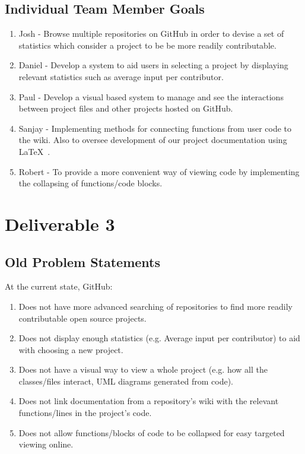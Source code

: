 \documentclass[12pt]{article}
\begin{document}
\subsection{Individual Team Member Goals}
\begin{enumerate}
\item Josh - Browse multiple repositories on \textsf{GitHub} in order to devise a set of statistics which consider a project to be be more readily contributable.
\item Daniel - Develop a system to aid users in selecting a project by displaying relevant statistics such as average input per contributor.  
\item Paul - Develop a visual based system to manage and see the interactions between project files and other projects hosted on \textsf{GitHub}.
\item Sanjay - Implementing methods for connecting functions from user code to the wiki. Also to oversee development of our project documentation using \LaTeX\ .
\item Robert - To provide a more convenient way of viewing code by implementing the collapsing of functions/code blocks.
\end{enumerate}

\pagebreak
\setcounter{section}{3}
\setcounter{subsection}{0}
\section*{Deliverable 3}
\subsection{Old Problem Statements}
At the current state, \textsf{GitHub}:
\begin{enumerate}
\item  Does not have more advanced searching of repositories to find more readily contributable open source projects.
\item Does not display enough statistics (e.g. Average input per contributor) to aid with choosing a new project.
\item Does not  have a visual way to view a whole project (e.g. how all the classes/files interact, UML diagrams generated from code).
\item Does not link documentation from a repository's wiki with the relevant functions/lines in the project's code.
\item Does not allow functions/blocks of code to be collapsed for easy targeted viewing online.
\end{enumerate}
\end{document}
